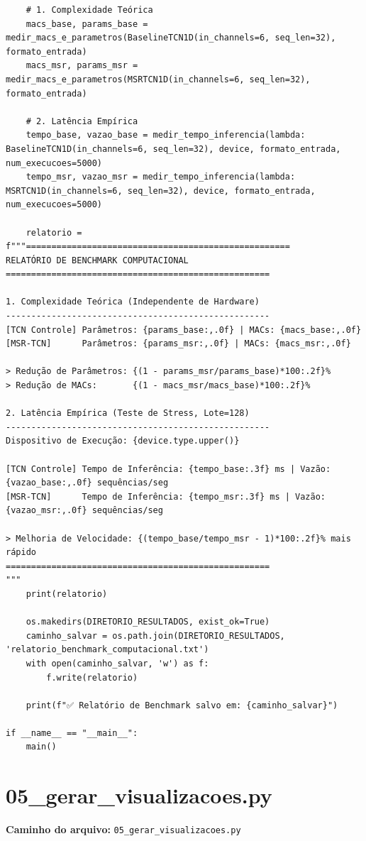 \documentclass{article}
\begin{document}
\begin{verbatim}
    # 1. Complexidade Teórica
    macs_base, params_base = medir_macs_e_parametros(BaselineTCN1D(in_channels=6, seq_len=32), formato_entrada)
    macs_msr, params_msr = medir_macs_e_parametros(MSRTCN1D(in_channels=6, seq_len=32), formato_entrada)
    
    # 2. Latência Empírica
    tempo_base, vazao_base = medir_tempo_inferencia(lambda: BaselineTCN1D(in_channels=6, seq_len=32), device, formato_entrada, num_execucoes=5000)
    tempo_msr, vazao_msr = medir_tempo_inferencia(lambda: MSRTCN1D(in_channels=6, seq_len=32), device, formato_entrada, num_execucoes=5000)
    
    relatorio = f"""====================================================
RELATÓRIO DE BENCHMARK COMPUTACIONAL
====================================================

1. Complexidade Teórica (Independente de Hardware)
----------------------------------------------------
[TCN Controle] Parâmetros: {params_base:,.0f} | MACs: {macs_base:,.0f}
[MSR-TCN]      Parâmetros: {params_msr:,.0f} | MACs: {macs_msr:,.0f}

> Redução de Parâmetros: {(1 - params_msr/params_base)*100:.2f}%
> Redução de MACs:       {(1 - macs_msr/macs_base)*100:.2f}%

2. Latência Empírica (Teste de Stress, Lote=128)
----------------------------------------------------
Dispositivo de Execução: {device.type.upper()}

[TCN Controle] Tempo de Inferência: {tempo_base:.3f} ms | Vazão: {vazao_base:,.0f} sequências/seg
[MSR-TCN]      Tempo de Inferência: {tempo_msr:.3f} ms | Vazão: {vazao_msr:,.0f} sequências/seg

> Melhoria de Velocidade: {(tempo_base/tempo_msr - 1)*100:.2f}% mais rápido
====================================================
"""
    print(relatorio)
    
    os.makedirs(DIRETORIO_RESULTADOS, exist_ok=True)
    caminho_salvar = os.path.join(DIRETORIO_RESULTADOS, 'relatorio_benchmark_computacional.txt')
    with open(caminho_salvar, 'w') as f:
        f.write(relatorio)
        
    print(f"✅ Relatório de Benchmark salvo em: {caminho_salvar}")

if __name__ == "__main__":
    main()
\end{verbatim}

\newpage

\section{05\_gerar\_visualizacoes.py}
\textbf{Caminho do arquivo:} \texttt{05\_gerar\_visualizacoes.py}
\end{document}
